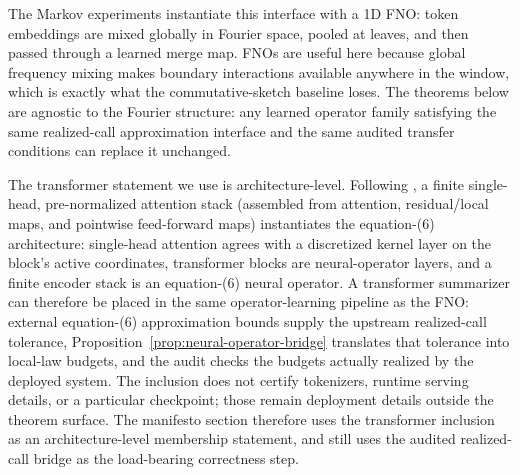 The Markov experiments instantiate this interface with a 1D FNO: token
embeddings are mixed globally in Fourier space, pooled at leaves, and
then passed through a learned merge map. FNOs are useful here because
global frequency mixing makes boundary interactions available anywhere in
the window, which is exactly what the commutative-sketch baseline loses.
The theorems below are agnostic to the Fourier structure: any learned
operator family satisfying the same realized-call approximation
interface and the same audited transfer conditions can replace it
unchanged.

The transformer statement we use is architecture-level. Following
\citet[Proposition~6]{Kovachki23NeuralOperator}, a finite
single-head, pre-normalized attention stack (assembled from
attention, residual/local maps, and pointwise feed-forward maps)
instantiates the equation-(6) architecture: single-head attention
agrees with a discretized kernel layer on the block's active
coordinates, transformer blocks are neural-operator layers, and a
finite encoder stack is an equation-(6) neural operator. A
transformer summarizer can therefore be placed in the same operator-learning
pipeline as the FNO: external equation-(6) approximation bounds supply
the upstream realized-call tolerance, Proposition~\ref{prop:neural-operator-bridge}
translates that tolerance into local-law budgets, and the audit checks
the budgets actually realized by the deployed system. The inclusion
does not certify tokenizers, runtime serving details, or a particular
checkpoint; those remain deployment details outside the theorem
surface. The manifesto section therefore uses the transformer
inclusion as an architecture-level membership statement, and still uses
the audited realized-call bridge as the load-bearing correctness step.
